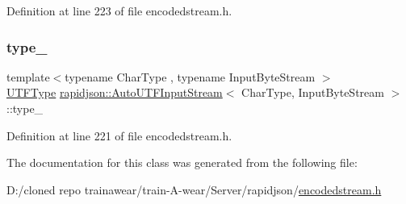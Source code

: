 Definition at line 223 of file encodedstream.\+h.

\mbox{\label{classrapidjson_1_1_auto_u_t_f_input_stream_a5549d9046ead614c3511d4991c6456fa}} 
\subsubsection{\texorpdfstring{type\_}{type\_}}
{\footnotesize\ttfamily template$<$typename Char\+Type , typename Input\+Byte\+Stream $>$ \\
\mbox{\hyperlink{namespacerapidjson_a4aacabc0f8cea1cd628f466d890773eb}{U\+T\+F\+Type}} \mbox{\hyperlink{classrapidjson_1_1_auto_u_t_f_input_stream}{rapidjson\+::\+Auto\+U\+T\+F\+Input\+Stream}}$<$ Char\+Type, Input\+Byte\+Stream $>$\+::type\+\_\+\hspace{0.3cm}{\ttfamily [private]}}



Definition at line 221 of file encodedstream.\+h.



The documentation for this class was generated from the following file\+:\begin{DoxyCompactItemize}
\item 
D\+:/cloned repo trainawear/train-\/\+A-\/wear/\+Server/rapidjson/\mbox{\hyperlink{encodedstream_8h}{encodedstream.\+h}}\end{DoxyCompactItemize}
